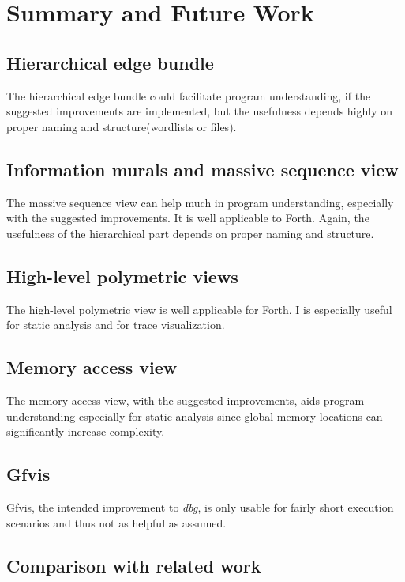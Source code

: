 \chapter{Summary and Future Work}
\label{chap:Summary}

\section*{Hierarchical edge bundle}
The hierarchical edge bundle could facilitate program understanding, if the suggested improvements are implemented, but the usefulness depends highly on proper naming and structure(wordlists or files).

\section*{Information murals and massive sequence view}
The massive sequence view can help much in program understanding, especially with the suggested improvements. It is well applicable to Forth. Again, the usefulness of the hierarchical part depends on proper naming and structure.

\section*{High-level polymetric views}

The high-level polymetric view is well applicable for Forth. I is especially useful for static analysis and for trace visualization.

\section*{Memory access view}

The memory access view, with the suggested improvements, aids program understanding especially for static analysis since global memory locations can significantly increase complexity.

\section*{Gfvis}

Gfvis, the intended improvement to \emph{dbg}, is only usable for fairly short execution scenarios and thus not as helpful as assumed.

\section{Comparison with related work}

